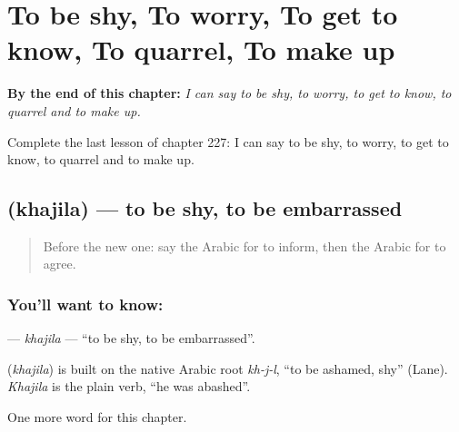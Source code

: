 
\chapter{To be shy, To worry, To get to know, To quarrel, To make up}
\label{ch:ar-to-be-shy-to-worry-to-get-to-know-to-quarrel-to-make-up}

\begin{chapteropening}
\textbf{By the end of this chapter:} \emph{I can say to be shy, to worry, to get to know, to quarrel and to make up.}

Complete the last lesson of chapter 227: I can say to be shy, to worry, to get to know, to quarrel and to make up.
\end{chapteropening}

\section[\texorpdfstring{\ar{خجل} (khajila)}{خجل (khajila)}]{ (khajila) — to be shy, to be embarrassed}

\label{lesson:AR-C227-khajila}



\begin{quote}
Before the new one: say the Arabic for to inform, then the Arabic for to agree.
\end{quote}

\subsection*{You'll want to know: }
\textbf{} — \emph{khajila} — \textquotedblleft{}to be shy, to be embarrassed\textquotedblright{}.

\begin{cousinweb}
\textbf{} (\emph{khajila}) is built on the native Arabic root \emph{kh-j-l}, \textquotedblleft{}to be ashamed, shy\textquotedblright{} (Lane). \emph{Khajila} is the plain verb, \textquotedblleft{}he was abashed\textquotedblright{}.
\end{cousinweb}

\begin{grammarlens}[title={What you've built}]
One more word for this chapter.
\end{grammarlens}

